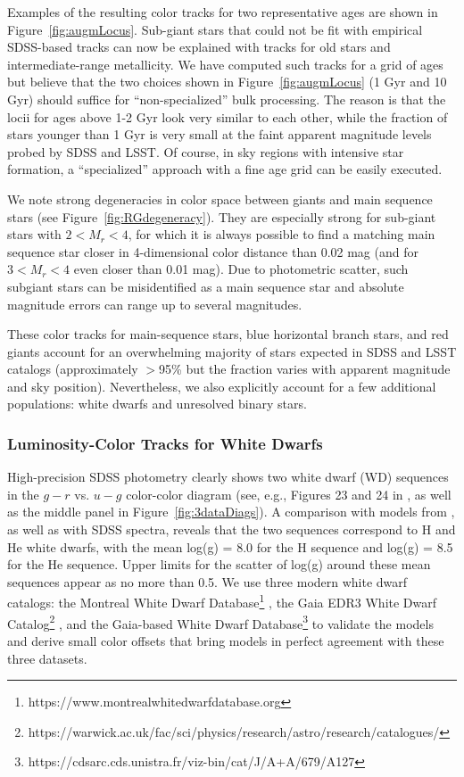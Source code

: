 Examples of the resulting color tracks for two representative ages are shown in Figure~\ref{fig:augmLocus}. Sub-giant stars that could not
be fit with empirical SDSS-based tracks can now be explained with tracks for old stars and intermediate-range metallicity. 
We have computed such tracks for a grid of ages but believe that the two choices shown in Figure~\ref{fig:augmLocus}
(1 Gyr and 10 Gyr) should suffice for ``non-specialized'' bulk processing. The reason is that the locii for ages above 1-2 Gyr look
very similar to each other, while the fraction of stars younger than 1 Gyr is very small at the faint apparent magnitude
levels probed by SDSS and LSST. Of course, in sky regions with intensive star formation, a ``specialized'' approach with
a fine age grid can be easily executed.

We note strong degeneracies in color space between giants and main sequence stars (see Figure~\ref{fig:RGdegeneracy}). 
They are especially strong for sub-giant stars with $2 < M_r < 4$, for which it is always possible to find a matching main sequence star
closer in 4-dimensional color distance than 0.02 mag (and for $3 < M_r < 4$ even closer than 0.01 mag). Due to photometric scatter, 
such subgiant stars can be misidentified as a main sequence star and absolute magnitude errors can range up to several magnitudes.


These color tracks for main-sequence stars,  blue horizontal branch stars, and red giants account for an overwhelming majority of stars 
expected in SDSS and LSST catalogs (approximately $>$95\% but the fraction varies with apparent magnitude and sky position). 
Nevertheless, we also explicitly account for a few additional populations: white dwarfs and unresolved binary stars. 


\subsubsection{Luminosity-Color Tracks for White Dwarfs}

High-precision SDSS photometry clearly shows two white dwarf (WD) sequences in the $g-r$ vs. $u-g$ color-color diagram
(see, e.g., Figures 23 and 24 in \citealt{2007AJ....134..973I}, as well as the middle panel in Figure~\ref{fig:3dataDiags}).
A comparison with models from \cite{1995PASP..107.1047B}, as well as with SDSS spectra, reveals that the two sequences
correspond to H and He white dwarfs, with the mean log(g) = 8.0 for the H sequence and log(g) = 8.5 for the He sequence.
Upper limits for the scatter of log(g) around these mean sequences appear as no more than 0.5. 
We use three modern white dwarf catalogs: the Montreal White Dwarf
Database\footnote{https://www.montrealwhitedwarfdatabase.org} \citep{2017ASPC..509....3D}, the Gaia EDR3 White Dwarf Catalog\footnote{https://warwick.ac.uk/fac/sci/physics/research/astro/research/catalogues/} \citep{2021MNRAS.508.3877G}, 
and the Gaia-based White Dwarf Database\footnote{https://cdsarc.cds.unistra.fr/viz-bin/cat/J/A+A/679/A127} \citep{2023A&A...679A.127G}
to validate the \cite{1995PASP..107.1047B} models and derive small color offsets that bring models in perfect agreement with these three datasets.

